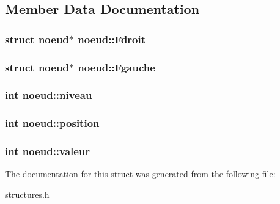 \subsection{Member Data Documentation}
\hypertarget{structnoeud_a4594b54a400996607318567324142e37}{
\subsubsection[{Fdroit}]{\setlength{\rightskip}{0pt plus 5cm}struct {\bf noeud}$\ast$ noeud\+::\+Fdroit}}\label{structnoeud_a4594b54a400996607318567324142e37}
\hypertarget{structnoeud_a6a44dcdda3708b7ef2e873e118accd97}{
\subsubsection[{Fgauche}]{\setlength{\rightskip}{0pt plus 5cm}struct {\bf noeud}$\ast$ noeud\+::\+Fgauche}}\label{structnoeud_a6a44dcdda3708b7ef2e873e118accd97}
\hypertarget{structnoeud_a8213ec379800aa3c5a0772cd15ac151a}{
\subsubsection[{niveau}]{\setlength{\rightskip}{0pt plus 5cm}int noeud\+::niveau}}\label{structnoeud_a8213ec379800aa3c5a0772cd15ac151a}
\hypertarget{structnoeud_a7fe3ce5cf4c61fce2382be3679cd7029}{
\subsubsection[{position}]{\setlength{\rightskip}{0pt plus 5cm}int noeud\+::position}}\label{structnoeud_a7fe3ce5cf4c61fce2382be3679cd7029}
\hypertarget{structnoeud_a943c55b643fdf9acd4bc8cda1dcfba06}{
\subsubsection[{valeur}]{\setlength{\rightskip}{0pt plus 5cm}int noeud\+::valeur}}\label{structnoeud_a943c55b643fdf9acd4bc8cda1dcfba06}


The documentation for this struct was generated from the following file\+:\begin{DoxyCompactItemize}
\item 
\hyperlink{structures_8h}{structures.\+h}\end{DoxyCompactItemize}
